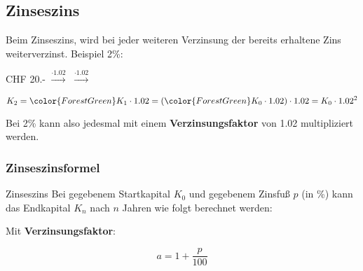 
\subsection{Zinseszins}


Beim Zinseszins, wird bei jeder weiteren Verzinsung der bereits
erhaltene Zins weiterverzinst. Beispiel 2\%:

CHF 20.- $\stackrel{\cdot{}1.02}{\longrightarrow}$  $\stackrel{\cdot{}1.02}{\longrightarrow}$ 

$$K_2 = {\color{ForestGreen}K_1}\cdot{}1.02 = ({\color{ForestGreen}K_0\cdot{}1.02})\cdot{}1.02 = K_0\cdot{}1.02^2$$

Bei 2\% kann also jedesmal mit einem \textbf{Verzinsungsfaktor} von
1.02 multipliziert werden.




\subsubsection{Zinseszinsformel}

\begin{gesetz}{Zinseszins}{}
Bei gegebenem Startkapital $K_0$ und gegebenem Zinsfuß $p$ (in \%) kann das Endkapital $K_n$ nach $n$ Jahren wie folgt berechnet werden:

\begin{center}\end{center}

Mit \textbf{Verzinsungsfaktor}:

$$a = 1 + \frac{p}{100}$$
\end{gesetz}

